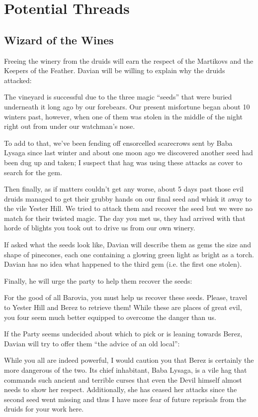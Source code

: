 \documentclass[a4paper,11pt]{article}
\begin{document}
\section{Potential Threads}
\label{sec:PotentialThreads}
\subsection{Wizard of the Wines}
Freeing the winery from the druids will earn the respect of the Martikovs and the Keepers of the Feather. Davian 
will be willing to explain why the druids attacked:
\begin{readout}
  The vineyard is successful due to the three magic ``seeds'' that were buried underneath it long ago by our 
  forebears. Our present misfortune began about 10 winters past, however, when one of them was stolen in the 
  middle of the night right out from under our watchman's nose.
  
  To add to that, we've been fending off ensorcelled scarecrows sent by Baba Lysaga since last winter and about 
  one moon ago we discovered another seed had been dug up and taken; I suspect that hag was using these attacks 
  as cover to search for the gem.
  
  Then finally, as if matters couldn't get any worse, about 5 days past those evil druids managed to get their 
  grubby hands on our final seed and whisk it away to the vile Yester Hill. We tried to attack them and recover 
  the seed but we were no match for their twisted magic. The day you met us, they had arrived with that horde of 
  blights you took out to drive us from our own winery.
\end{readout}
If asked what the seeds look like, Davian will describe them as gems the size and shape of pinecones, each one 
containing a glowing green light as bright as a torch. Davian has no idea what happened to the third gem (i.e. 
the first one stolen).
\par Finally, he will urge the party to help them recover the seeds:
\begin{readout}
  For the good of all Barovia, you must help us recover these seeds. Please, travel to Yester Hill and Berez to 
  retrieve them! While these are places of great evil, you four seem much better equipped to overcome the danger 
  than us.
\end{readout}
If the Party seems undecided about which to pick or is leaning towards Berez, Davian will try to offer them ``the 
advice of an old local'':
\begin{readout}
  While you all are indeed powerful, I would caution you that Berez is certainly the more dangerous of the two.
  Its chief inhabitant, Baba Lysaga, is a vile hag that commands such ancient and terrible curses that even the 
  Devil himself almost needs to show her respect. Additionally, she has ceased her attacks since the second seed 
  went missing and thus I have more fear of future reprisals from the druids for your work here.
\end{readout}
\end{document}

